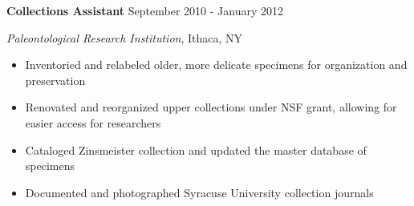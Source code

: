 
\vspace{7pt}

\textbf{Collections Assistant} \hfill September 2010 - January 2012

\textit{Paleontological Research Institution}, Ithaca, NY

\begin{itemize}
    \item Inventoried and relabeled older, more delicate specimens for organization and preservation
    \item Renovated and reorganized upper collections under NSF grant, allowing for easier access for researchers
    \item Cataloged Zinsmeister collection and updated the master database of specimens
    \item Documented and photographed Syracuse University collection journals
\end{itemize}
